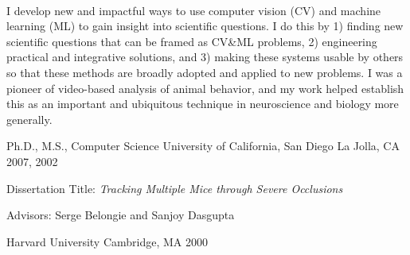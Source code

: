 \documentclass[11pt, letterpaper]{awesome-cv}
\begin{document}
\makecvheader[C]


% 
% 
% 
% 

\vspace{\acvSectionContentTopSkip}\\
I develop new and impactful ways to use computer vision (CV) and machine learning (ML) to gain insight into scientific questions. I do this by 1) finding new scientific questions that can be framed as CV\&ML problems, 2) engineering practical and integrative solutions, and 3) making these systems usable by others so that these methods are broadly adopted and applied to new problems. I was a pioneer of video-based analysis of animal behavior, and my work helped establish this as an important and ubiquitous technique in neuroscience and biology more generally.

\begin{cventries}
  \cventry
    {Ph.D., M.S., Computer Science} %
    {University of California, San Diego} %
    {La Jolla, CA} %
    {2007, 2002} %
    {
      \begin{cvitems} %
      \item Dissertation Title: {\it Tracking Multiple Mice through Severe Occlusions}
      \item Advisors: Serge Belongie and Sanjoy Dasgupta
      \end{cvitems}
    }
    {Harvard University}
    {Cambridge, MA}
    {2000}
    {}
\end{cventries}
\vspace{-4mm}


\begin{cventries}
\end{cventries}
\end{document}
